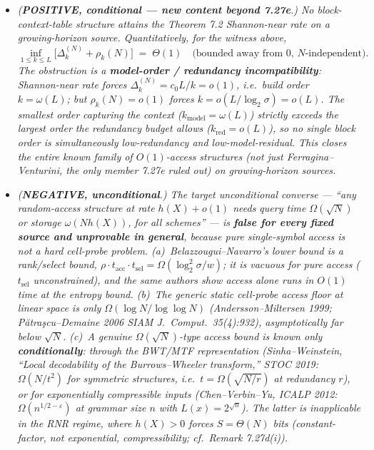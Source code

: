 \documentclass[
]{article}
\begin{document}
\begin{itemize}
\item[\emph{(i)}] \emph{(\textbf{POSITIVE, conditional --- new content
beyond 7.27e}.) No block-context-table structure attains the Theorem 7.2
Shannon-near rate on a growing-horizon source. Quantitatively, for the
witness above,}
\[
  \inf_{1 \leq k \leq L}\bigl[\Delta_k^{(N)} + \rho_k(N)\bigr]
  \;=\; \Theta(1) \quad\text{(bounded away from $0$, $N$-independent).}
\]
\emph{The obstruction is a \textbf{model-order / redundancy
incompatibility}: Shannon-near rate forces $\Delta_k^{(N)} = c_0 L/k =
o(1)$, i.e.\ build order $k = \omega(L)$; but $\rho_k(N) = o(1)$ forces
$k = o(L/\log_2\sigma) = o(L)$. The smallest order capturing the context
($k_{\mathrm{model}} = \omega(L)$) strictly exceeds the largest order the
redundancy budget allows ($k_{\mathrm{red}} = o(L)$), so no single block
order is simultaneously low-redundancy and low-model-residual. This
closes the \emph{entire known family} of $O(1)$-access structures (not
just Ferragina--Venturini, the only member 7.27e ruled out) on
growing-horizon sources.}
\item[\emph{(ii)}] \emph{(\textbf{NEGATIVE, unconditional}.) The target
\emph{unconditional} converse --- ``any random-access structure at rate
$h(X)+o(1)$ needs query time $\Omega(\sqrt N)$ or storage $\omega(N
h(X))$, for all schemes'' --- is \textbf{false for every fixed source and
unprovable in general}, because pure single-symbol \emph{access} is not a
hard cell-probe problem. (a)~Belazzougui--Navarro's lower bound is a
\emph{rank}/\emph{select} bound, $\rho\cdot t_{\mathrm{acc}}\cdot
t_{\mathrm{sel}} = \Omega(\log_2^2\sigma/w)$; it is vacuous for pure
access ($t_{\mathrm{sel}}$ unconstrained), and the same authors show
access alone runs in $O(1)$ time at the entropy bound. (b)~The generic
static cell-probe \emph{access} floor at linear space is only $\Omega(\log
N/\log\log N)$ (Andersson--Miltersen 1999; P\u{a}tra\c{s}cu--Demaine 2006
\emph{SIAM J.\ Comput.}\ 35(4):932), asymptotically far below $\sqrt N$.
(c)~A genuine $\Omega(\sqrt N)$-type access bound is known only
\textbf{conditionally}: through the BWT/MTF representation
(Sinha--Weinstein, ``Local decodability of the Burrows--Wheeler
transform,'' STOC 2019: $\Omega(N/t^2)$ for symmetric structures, i.e.\
$t = \Omega(\sqrt{N/r})$ at redundancy $r$), or for \emph{exponentially}
compressible inputs (Chen--Verbin--Yu, ICALP 2012: $\Omega(n^{1/2
-\varepsilon})$ at grammar size $n$ with $L(x) = 2^{\sqrt n}$). The latter
is inapplicable in the RNR regime, where $h(X) > 0$ forces $S = \Theta(N)$
bits (constant-factor, not exponential, compressibility; cf.\ Remark
7.27d(i)).}
\end{itemize}
\end{document}
